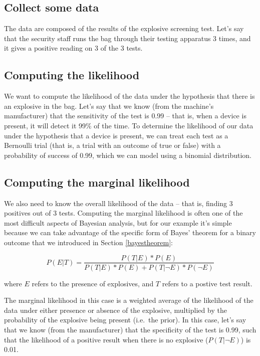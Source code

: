 \documentclass[12pt,]{book}
\theoremstyle{definition}
\theoremstyle{definition}
\theoremstyle{definition}
\theoremstyle{remark}
\begin{document}
\hypertarget{collect-some-data}{%
\subsection{Collect some data}\label{collect-some-data}}

The data are composed of the results of the explosive screening test. Let's say that the security staff runs the bag through their testing apparatus 3 times, and it gives a positive reading on 3 of the 3 tests.

\hypertarget{computing-the-likelihood}{%
\subsection{Computing the likelihood}\label{computing-the-likelihood}}

We want to compute the likelihood of the data under the hypothesis that there is an explosive in the bag. Let's say that we know (from the machine's manufacturer) that the sensitivity of the test is 0.99 -- that is, when a device is present, it will detect it 99\% of the time. To determine the likelihood of our data under the hypothesis that a device is present, we can treat each test as a Bernoulli trial (that is, a trial with an outcome of true or false) with a probability of success of 0.99, which we can model using a binomial distribution.

\hypertarget{computing-the-marginal-likelihood}{%
\subsection{Computing the marginal likelihood}\label{computing-the-marginal-likelihood}}

We also need to know the overall likelihood of the data -- that is, finding 3 positives out of 3 tests. Computing the marginal likelihood is often one of the most difficult aspects of Bayesian analysis, but for our example it's simple because we can take advantage of the specific form of Bayes' theorem for a binary outcome that we introduced in Section \ref{bayestheorem}:

\[
P(E|T) = \frac{P(T|E)*P(E)}{P(T|E)*P(E) + P(T|\neg E)*P(\neg E)}
\]

where \(E\) refers to the presence of explosives, and \(T\) refers to a postive test result.

The marginal likelihood in this case is a weighted average of the likelihood of the data under either presence or absence of the explosive, multiplied by the probability of the explosive being present (i.e.~the prior). In this case, let's say that we know (from the manufacturer) that the specificity of the test is 0.99, such that the likelihood of a positive result when there is no explosive (\(P(T|\neg E)\)) is 0.01.
\end{document}

